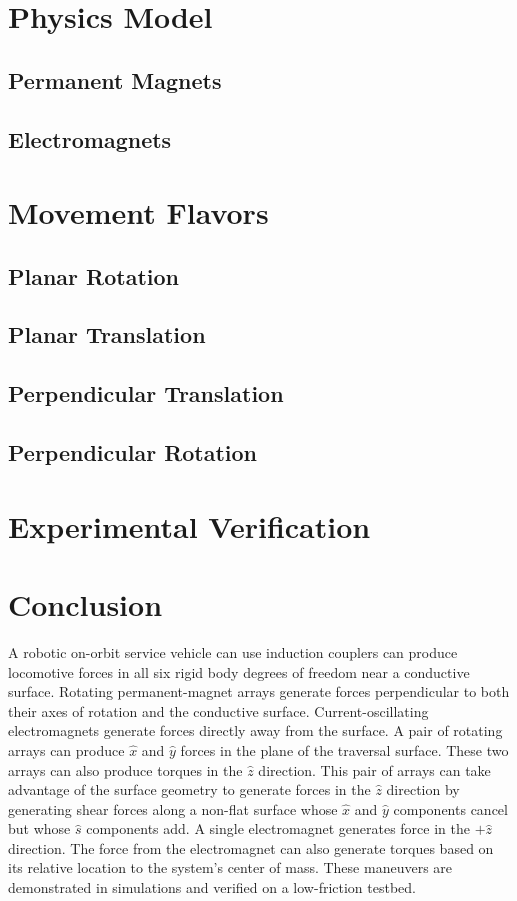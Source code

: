 \documentclass[10pt]{article}
\begin{document}
\section{Physics Model}
\label{sec:model}
\subsection{Permanent Magnets}
\subsection{Electromagnets}
\section{Movement Flavors}
\label{sec:movements}
\subsection{Planar Rotation}
\subsection{Planar Translation}
\subsection{Perpendicular Translation}
\subsection{Perpendicular Rotation}
\section{Experimental Verification}
\label{sec:experiments}
\section{Conclusion}
A robotic on-orbit service vehicle can use induction couplers can produce locomotive forces in all six rigid body degrees of freedom near a conductive surface. Rotating permanent-magnet arrays generate forces perpendicular to both their axes of rotation and the conductive surface. Current-oscillating electromagnets generate forces directly away from the surface. A pair of rotating arrays can produce $\hat{x}$ and $\hat{y}$ forces in the plane of the traversal surface. These two arrays can also produce torques in the $\hat{z}$ direction. This pair of arrays can take advantage of the surface geometry to generate forces in the $\hat{z}$ direction by generating shear forces along a non-flat surface whose $\hat{x}$ and $\hat{y}$ components cancel but whose $\hat{s}$ components add. A single electromagnet generates force in the $+\hat{z}$ direction. The force from the electromagnet can also generate torques based on its relative location to the system's center of mass. These maneuvers are demonstrated in simulations and verified on a low-friction testbed.  
\end{document}
